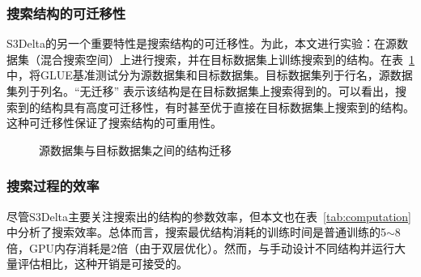 \subsubsection{搜索结构的可迁移性}
S3Delta的另一个重要特性是搜索结构的可迁移性。为此，本文进行实验：在源数据集（混合搜索空间）上进行搜索，并在目标数据集上训练搜索到的结构。在表~\ref{tab:transfer}中，将GLUE基准测试分为源数据集和目标数据集。目标数据集列于行名，源数据集列于列名。“无迁移” 表示该结构是在目标数据集上搜索得到的。可以看出，搜索到的结构具有高度可迁移性，有时甚至优于直接在目标数据集上搜索到的结构。这种可迁移性保证了搜索结构的可重用性。

\begin{figure}
\caption{源数据集与目标数据集之间的结构迁移}
\centering
\label{tab:transfer}
\end{figure}



\subsubsection{搜索过程的效率}
尽管S3Delta主要关注搜索出的结构的参数效率，但本文也在表~\ref{tab:computation}中分析了搜索效率。总体而言，搜索最优结构消耗的训练时间是普通训练的5$\sim$8倍，GPU内存消耗是2倍（由于双层优化）。然而，与手动设计不同结构并运行大量评估相比，这种开销是可接受的。


